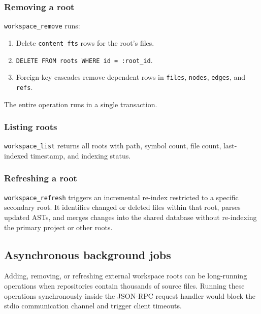 \subsubsection{Removing a root}

\texttt{workspace\_remove} runs:
\begin{enumerate}
  \item Delete \texttt{content\_fts} rows for the root's files.
  \item \texttt{DELETE FROM roots WHERE id = :root\_id}.
  \item Foreign-key cascades remove dependent rows in \texttt{files},
        \texttt{nodes}, \texttt{edges}, and \texttt{refs}.
\end{enumerate}
The entire operation runs in a single transaction.

\subsubsection{Listing roots}

\texttt{workspace\_list} returns all roots with path, symbol count, file
count, last-indexed timestamp, and indexing status.

\subsubsection{Refreshing a root}

\texttt{workspace\_refresh} triggers an incremental re-index restricted to a
specific secondary root. It identifies changed or deleted files within that
root, parses updated ASTs, and merges changes into the shared database
without re-indexing the primary project or other roots.

\subsection{Asynchronous background jobs}

Adding, removing, or refreshing external workspace roots can be long-running
operations when repositories contain thousands of source files. Running these
operations synchronously inside the JSON-RPC request handler would block the
stdio communication channel and trigger client timeouts.

